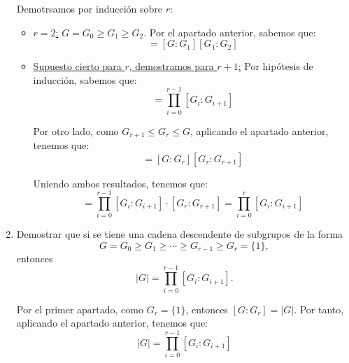 \begin{ejercicio}
\begin{enumerate}
        Demotrsamos por inducción sobre $r$:
        \begin{itemize}
            \item \ul{$r=2$:} $G=G_0\geq G_1\geq G_2$. Por el apartado anterior, sabemos que:
            \begin{equation*}
                [G:G_2]=[G:G_1][G_1:G_2]
            \end{equation*}

            \item \ul{Supuesto cierto para $r$, demostramos para $r+1$:}
            Por hipótesis de inducción, sabemos que:
            \begin{equation*}
                [G:G_r]=\prod_{i=0}^{r-1}[G_i:G_{i+1}]
            \end{equation*}

            Por otro lado, como $G_{r+1}\leq G_r\leq G$, aplicando el apartado anterior, tenemos que:
            \begin{equation*}
                [G:G_{r+1}]=[G:G_r][G_r:G_{r+1}]
            \end{equation*}

            Uniendo ambos resultados, tenemos que:
            \begin{equation*}
                [G:G_{r+1}]=\prod_{i=0}^{r-1}[G_i:G_{i+1}]\cdot [G_r:G_{r+1}]
                = \prod_{i=0}^{r}[G_i:G_{i+1}]
            \end{equation*}
        \end{itemize}
        \item Demostrar que si se tiene una cadena descendente de subgrupos de la forma
        \[
            G = G_0 \geq G_1 \geq \cdots \geq G_{r - 1} \geq G_r = \{1\},
        \]
        entonces
        \[
            |G| = \prod_{i = 0}^{r - 1}[G_i : G_{i + 1}].
        \]

        Por el primer apartado, como $G_r=\{1\}$, entonces $[G:G_r]=|G|$. Por tanto, aplicando el apartado anterior, tenemos que:
        \begin{equation*}
            |G|=\prod_{i=0}^{r-1}[G_i:G_{i+1}]
        \end{equation*}
    \end{enumerate}
\end{ejercicio}

